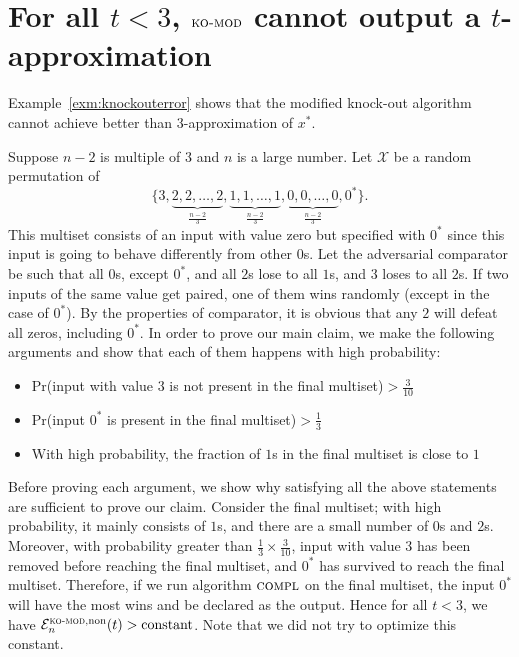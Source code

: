 \documentclass[twoside,11pt]{article}
\newcommand{\cX}{\mathcal{X}}
\newcommand{\cE}{\mathcal{E}}
\newcommand{\pr}{\text{Pr}}
\newcommand{\algorithms}[1]{\textsc{#1}}
\newcommand{\algcomp}{\algorithms{compl}}
\newcommand{\algkomod}{\algorithms{ko-mod}}
\newcommand{\maxx}{x^*}
\newcommand{\pe}{\cE}
\newcommand{\nonadaptive}{\textnormal{non}}
\begin{document}
\section{For all $t<3$, $\algkomod$ cannot output a $t$-approximation}
\label{sec:app-example}
Example~\ref{exm:knockouterror} shows that the modified knock-out algorithm cannot achieve
better than $3$-approximation of $\maxx$. 
\begin{example}
\label{exm:knockouterror}
Suppose $n-2$ is multiple of $3$ and $n$ is a large number. Let $\cX$ be a random permutation of
\[
 \{3,\underbrace{2,2,\ldots,2}_{\frac{n-2}{3}},\underbrace{1,1,\ldots,1}_{\frac{n-2}{3}},\underbrace{0,0,\ldots,0}_{\frac{n-2}{3}},0^*\}.
\]
This multiset consists of an input with value zero but specified with
$0^*$ since this input is going to behave differently from other
$0$s. Let the adversarial comparator be such that all $0$s, except
$0^*$, and all $2$s lose to all $1$s, and $3$ loses to all $2$s. If
two inputs of the same value get paired, one of them wins randomly
(except in the case of $0^*$). By the properties of comparator, it is
obvious that any $2$ will defeat all zeros, including $0^*$. In order
to prove our main claim, we make the following arguments and show that
each of them happens with high probability:
\begin{itemize}
\item $\pr$(input with value $3$ is not present in the final multiset)$>\frac3{10}$
\item  $\pr$(input $0^*$ is present in the final multiset)$>\frac13$
\item With high probability, the fraction of $1$s in the final multiset is close to $1$
\end{itemize}
Before proving each argument, we show why satisfying all the above statements are sufficient to prove our claim. Consider the final multiset; with high probability, it mainly consists of $1$s, and there are a small number of $0$s and $2$s. Moreover, with probability greater than $\frac1{3}\times \frac3{10}$, input with value $3$ has been removed before reaching the final multiset, and $0^*$ has survived to reach the final multiset. Therefore, if we run algorithm $\algcomp$ on the final multiset, the input $0^*$ will have the most wins and be declared as the output. Hence for all $t<3$, we have $\pe_n^{\algkomod,\nonadaptive}(t)>\text{constant}$. Note that we did not try to optimize this constant.


\end{example}
\end{document}
